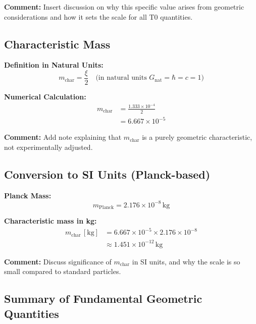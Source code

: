 \documentclass[12pt,a4paper]{article}
\newcommand{\xipar}{\xi}            %
\newcommand{\mchar}{m_{\text{char}}} %
\begin{document}
\textbf{Comment:} Insert discussion on why this specific value arises from geometric considerations and how it sets the scale for all T0 quantities.

\subsection{Characteristic Mass}

\textbf{Definition in Natural Units:}
\begin{equation}
	\mchar = \frac{\xipar}{2} \quad \text{(in natural units } G_{\text{nat}} = \hbar = c = 1\text{)}
\end{equation}

\textbf{Numerical Calculation:}
\begin{align}
	\mchar &= \frac{1{.}333 \times 10^{-4}}{2} \\
	&= 6{.}667 \times 10^{-5}
\end{align}

\textbf{Comment:} Add note explaining that $\mchar$ is a purely geometric characteristic, not experimentally adjusted.

\subsection{Conversion to SI Units (Planck-based)}

\textbf{Planck Mass:}
\begin{equation}
	m_\text{Planck} = 2.176 \times 10^{-8}\,\text{kg}
\end{equation}

\textbf{Characteristic mass in kg:}
\begin{align}
	\mchar \,[\text{kg}] &= 6{.}667 \times 10^{-5} \times 2.176 \times 10^{-8} \\
	&\approx 1.451 \times 10^{-12}\,\text{kg}
\end{align}

\textbf{Comment:} Discuss significance of $\mchar$ in SI units, and why the scale is so small compared to standard particles.

\subsection{Summary of Fundamental Geometric Quantities}
\end{document}
